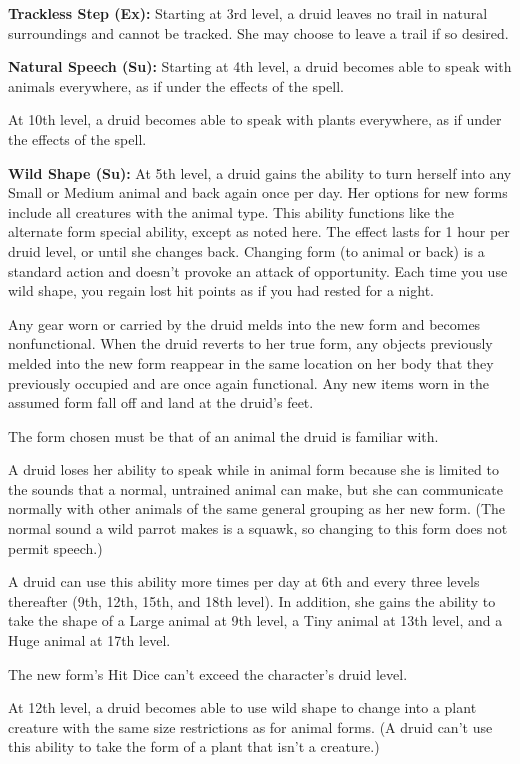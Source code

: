 \textbf{Trackless Step (Ex):} Starting at 3rd level, a druid leaves no trail in natural surroundings and cannot be tracked. She may choose to leave a trail if so desired.

\textbf{Natural Speech (Su):} Starting at 4th level, a druid becomes able to speak with animals everywhere, as if under the effects of the  spell.

At 10th level, a druid becomes able to speak with plants everywhere, as if under the effects of the  spell.

\textbf{Wild Shape (Su):} At 5th level, a druid gains the ability to turn herself into any Small or Medium animal and back again once per day. Her options for new forms include all creatures with the animal type. This ability functions like the alternate form special ability, except as noted here. The effect lasts for 1 hour per druid level, or until she changes back. Changing form (to animal or back) is a standard action and doesn't provoke an attack of opportunity. Each time you use wild shape, you regain lost hit points as if you had rested for a night.

Any gear worn or carried by the druid melds into the new form and becomes nonfunctional. When the druid reverts to her true form, any objects previously melded into the new form reappear in the same location on her body that they previously occupied and are once again functional. Any new items worn in the assumed form fall off and land at the druid's feet.

The form chosen must be that of an animal the druid is familiar with.

A druid loses her ability to speak while in animal form because she is limited to the sounds that a normal, untrained animal can make, but she can communicate normally with other animals of the same general grouping as her new form. (The normal sound a wild parrot makes is a squawk, so changing to this form does not permit speech.)

A druid can use this ability more times per day at 6th and every three levels thereafter (9th, 12th, 15th, and 18th level). In addition, she gains the ability to take the shape of a Large animal at 9th level, a Tiny animal at 13th level, and a Huge animal at 17th level.

The new form's Hit Dice can't exceed the character's druid level.

At 12th level, a druid becomes able to use wild shape to change into a plant creature with the same size restrictions as for animal forms. (A druid can't use this ability to take the form of a plant that isn't a creature.)

